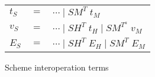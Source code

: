 \begin{figure}
\begin{center}
\begin{tabular}{lcl}
$t_{S}$ & $=$ & $\cdots\;\vert\;SM^{T}\;t_{M}$ \\
$v_{S}$ & $=$ & $\cdots\;\vert\;SH^{T}\;t_{H}\;\vert\;SM^{T^{a}}\;v_{M}$ \\
$E_{S}$ & $=$ & $\cdots\;\vert\;SH^{T}\;E_{H}\;\vert\;SM^{T}\;E_{M}$
\end{tabular}
\end{center}
\caption{Scheme interoperation terms}
\label{fig:sit}
\end{figure}